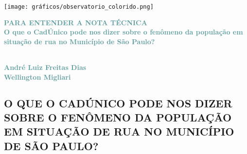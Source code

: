 \documentclass[14pt]{extarticle}
\begin{document}
\thispagestyle{empty}

\texttt{[image: gráficos/observatorio\_colorido.png]}



\begin{center}
\vspace{3cm}
{\textcolor{CadetBlue}{\large\textbf{\uppercase{Para Entender a Nota Técnica}}}}\\
\vspace{2cm}
{\textcolor{CadetBlue}{\Large\textbf{O que o CadÚnico pode nos dizer sobre o fenômeno da população em situação de rua no Município de São Paulo?}}}\\
\vspace{0.1cm}
{\textcolor{red}{\Large\textsc{}}}\\
\vspace{0.1cm}
{\textcolor{red}{\Large\textsc{}}}
\vspace{0.1cm}
{\textcolor{red}{\Large\textsc{}}}
\end{center}

\vspace{6cm}

\hfill%
\begin{minipage}[t]{14cm}
\begin{flushright}
{\textcolor{CadetBlue}{\large\textbf{André Luiz Freitas Dias}}}\\
\vspace{0.2cm}
{\textcolor{CadetBlue}{\large\textbf{Wellington Migliari}}}\\
\vspace{0.8cm}
\end{flushright}
\end{minipage}

\vspace{4.5cm}
\noindent{}
\restoregeometry
\newpage

\setcounter{page}{1}
\begin{center}
\section*{O QUE O CADÚNICO PODE NOS DIZER SOBRE O FENÔMENO DA POPULAÇÃO EM SITUAÇÃO DE RUA NO MUNICÍPIO DE SÃO PAULO?}
\end{center}
\vspace{1cm}
\end{document}
